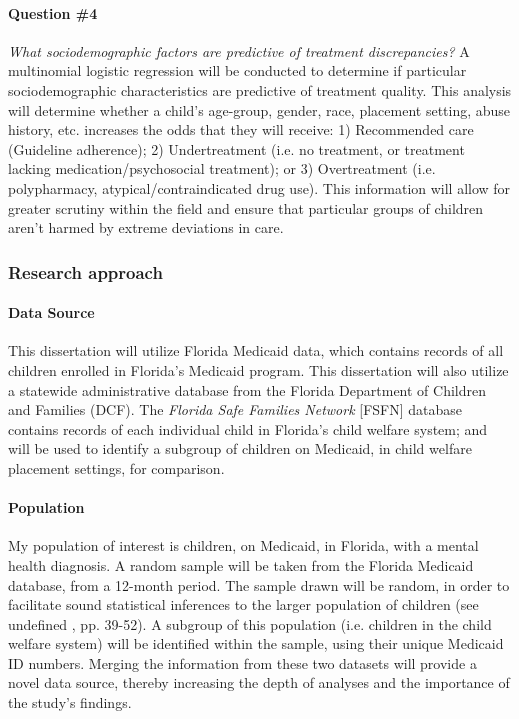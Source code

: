 \documentclass[twocolumn, issue, rga, authordate]{jote-new-article}
\begin{document}
\paragraph{Question \#4} \emph{What sociodemographic factors are
predictive of treatment discrepancies?} A multinomial logistic
regression will be conducted to determine if particular sociodemographic
characteristics are predictive of treatment quality. This analysis will
determine whether a child's age-group, gender, race, placement setting,
abuse history, etc. increases the odds that they will receive: 1)
Recommended care (Guideline adherence); 2) Undertreatment (i.e. no
treatment, or treatment lacking medication/psychosocial treatment); or
3) Overtreatment (i.e. polypharmacy, atypical/contraindicated drug use).
This information will allow for greater scrutiny within the field and
ensure that particular groups of children aren't harmed by extreme
deviations in care.


\subsubsection{Research approach}


\paragraph{Data Source} This dissertation will utilize Florida Medicaid
data, which contains records of all children enrolled in Florida's
Medicaid program. This dissertation will also utilize a statewide
administrative database from the Florida Department of Children and
Families (DCF). The \emph{Florida Safe Families Network} {[}FSFN{]}
database contains records of each individual child in Florida's child
welfare system; and will be used to identify a subgroup of children on
Medicaid, in child welfare placement settings, for comparison.

\paragraph{Population} My population of interest is children, on Medicaid,
in Florida, with a mental health diagnosis. A random sample will be
taken from the Florida Medicaid database, from a 12-month period. The
sample drawn will be random, in order to facilitate sound statistical
inferences to the larger population of children (see undefined \citeyear{Berk2004}, pp.
39-52). A subgroup of this population (i.e. children in the child
welfare system) will be identified within the sample, using their unique
Medicaid ID numbers. Merging the information from these two datasets
will provide a novel data source, thereby increasing the depth of
analyses and the importance of the study's findings.
\end{document}
